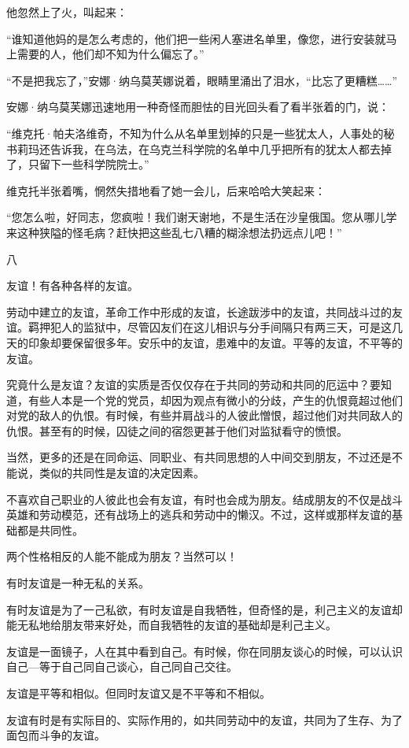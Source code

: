 他忽然上了火，叫起来：

“谁知道他妈的是怎么考虑的，他们把一些闲人塞进名单里，像您，进行安装就马上需要的人，他们却不知为什么偏忘了。”

“不是把我忘了，”安娜·纳乌莫芙娜说着，眼睛里涌出了泪水，“比忘了更糟糕……”

安娜·纳乌莫芙娜迅速地用一种奇怪而胆怯的目光回头看了看半张着的门，说：

“维克托·帕夫洛维奇，不知为什么从名单里划掉的只是一些犹太人，人事处的秘书莉玛还告诉我，在乌法，在乌克兰科学院的名单中几乎把所有的犹太人都去掉了，只留下一些科学院院士。”

维克托半张着嘴，惘然失措地看了她一会儿，后来哈哈大笑起来：

“您怎么啦，好同志，您疯啦！我们谢天谢地，不是生活在沙皇俄国。您从哪儿学来这种狭隘的怪毛病？赶快把这些乱七八糟的糊涂想法扔远点儿吧！”

八

友谊！有各种各样的友谊。

劳动中建立的友谊，革命工作中形成的友谊，长途跋涉中的友谊，共同战斗过的友谊。羁押犯人的监狱中，尽管囚友们在这儿相识与分手间隔只有两三天，可是这几天的印象却要保留很多年。安乐中的友谊，患难中的友谊。平等的友谊，不平等的友谊。

究竟什么是友谊？友谊的实质是否仅仅存在于共同的劳动和共同的厄运中？要知道，有些人本是一个党的党员，却因为观点有微小的分歧，产生的仇恨竟超过他们对党的敌人的仇恨。有时候，有些并肩战斗的人彼此憎恨，超过他们对共同敌人的仇恨。甚至有的时候，囚徒之间的宿怨更甚于他们对监狱看守的愤恨。

当然，更多的还是在同命运、同职业、有共同思想的人中间交到朋友，不过还是不能说，类似的共同性是友谊的决定因素。

不喜欢自己职业的人彼此也会有友谊，有时也会成为朋友。结成朋友的不仅是战斗英雄和劳动模范，还有战场上的逃兵和劳动中的懒汉。不过，这样或那样友谊的基础都是共同性。

两个性格相反的人能不能成为朋友？当然可以！

有时友谊是一种无私的关系。

有时友谊是为了一己私欲，有时友谊是自我牺牲，但奇怪的是，利己主义的友谊却能无私地给朋友带来好处，而自我牺牲的友谊的基础却是利己主义。

友谊是一面镜子，人在其中看到自己。有时候，你在同朋友谈心的时候，可以认识自己—等于自己同自己谈心，自己同自己交往。

友谊是平等和相似。但同时友谊又是不平等和不相似。

友谊有时是有实际目的、实际作用的，如共同劳动中的友谊，共同为了生存、为了面包而斗争的友谊。

